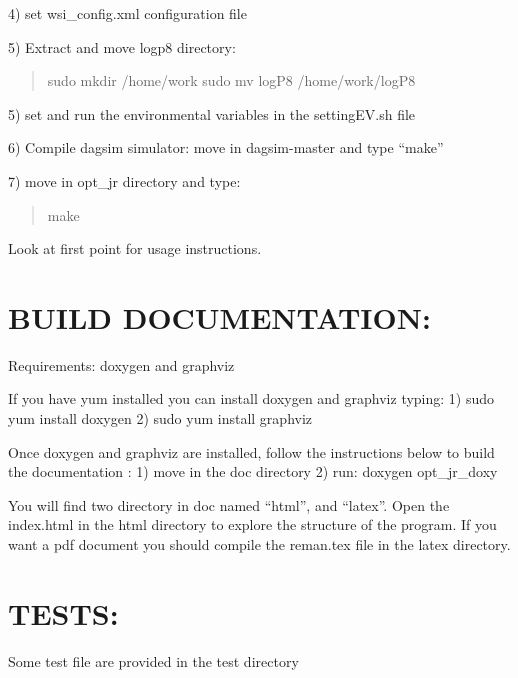 4) set wsi\-\_\-config.\-xml configuration file

5) Extract and move logp8 directory\-: \begin{quotation}
sudo mkdir /home/work sudo mv log\-P8 /home/work/log\-P8

\end{quotation}


5) set and run the environmental variables in the setting\-E\-V.\-sh file

6) Compile dagsim simulator\-: move in dagsim-\/master and type “make”

7) move in opt\-\_\-jr directory and type\-: \begin{quotation}
make

\end{quotation}


Look at first point for usage instructions.

\section*{B\-U\-I\-L\-D D\-O\-C\-U\-M\-E\-N\-T\-A\-T\-I\-O\-N\-:}

Requirements\-: doxygen and graphviz

If you have yum installed you can install doxygen and graphviz typing\-: 1) sudo yum install doxygen 2) sudo yum install graphviz

Once doxygen and graphviz are installed, follow the instructions below to build the documentation \-: 1) move in the doc directory 2) run\-: doxygen opt\-\_\-jr\-\_\-doxy

You will find two directory in doc named “html”, and “latex”. Open the index.\-html in the html directory to explore the structure of the program. If you want a pdf document you should compile the reman.\-tex file in the latex directory.

\section*{T\-E\-S\-T\-S\-:}

Some test file are provided in the test directory 